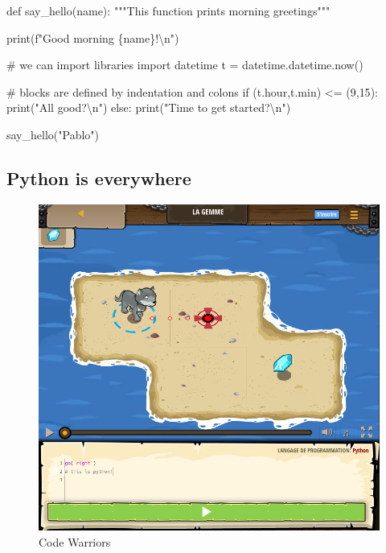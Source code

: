 \documentclass[
  letterpaper,
  DIV=11,
  numbers=noendperiod]{scrartcl}
\newenvironment{Shaded}{\begin{snugshade}}{\end{snugshade}}
\newcommand{\BuiltInTok}[1]{\textcolor[rgb]{0.00,0.23,0.31}{#1}}
\newcommand{\CharTok}[1]{\textcolor[rgb]{0.13,0.47,0.30}{#1}}
\newcommand{\CommentTok}[1]{\textcolor[rgb]{0.37,0.37,0.37}{#1}}
\newcommand{\ControlFlowTok}[1]{\textcolor[rgb]{0.00,0.23,0.31}{#1}}
\newcommand{\DecValTok}[1]{\textcolor[rgb]{0.68,0.00,0.00}{#1}}
\newcommand{\ImportTok}[1]{\textcolor[rgb]{0.00,0.46,0.62}{#1}}
\newcommand{\KeywordTok}[1]{\textcolor[rgb]{0.00,0.23,0.31}{#1}}
\newcommand{\NormalTok}[1]{\textcolor[rgb]{0.00,0.23,0.31}{#1}}
\newcommand{\OperatorTok}[1]{\textcolor[rgb]{0.37,0.37,0.37}{#1}}
\newcommand{\SpecialCharTok}[1]{\textcolor[rgb]{0.37,0.37,0.37}{#1}}
\newcommand{\SpecialStringTok}[1]{\textcolor[rgb]{0.13,0.47,0.30}{#1}}
\newcommand{\StringTok}[1]{\textcolor[rgb]{0.13,0.47,0.30}{#1}}
\begin{document}
\begin{Shaded}
\begin{Highlighting}[]
\KeywordTok{def}\NormalTok{ say\_hello(name):}
    \CommentTok{"""This function prints morning greetings"""}

    \BuiltInTok{print}\NormalTok{(}\SpecialStringTok{f"Good morning }\SpecialCharTok{\{}\NormalTok{name}\SpecialCharTok{\}}\SpecialStringTok{!}\CharTok{\textbackslash{}n}\SpecialStringTok{"}\NormalTok{)}

    \CommentTok{\# we can import libraries}
    \ImportTok{import}\NormalTok{ datetime}
\NormalTok{    t }\OperatorTok{=}\NormalTok{ datetime.datetime.now()}

    \CommentTok{\# blocks are defined by indentation and colons}
    \ControlFlowTok{if}\NormalTok{ (t.hour,t.}\BuiltInTok{min}\NormalTok{) }\OperatorTok{\textless{}=}\NormalTok{ (}\DecValTok{9}\NormalTok{,}\DecValTok{15}\NormalTok{):}
        \BuiltInTok{print}\NormalTok{(}\StringTok{"All good?}\CharTok{\textbackslash{}n}\StringTok{"}\NormalTok{)}
    \ControlFlowTok{else}\NormalTok{:}
        \BuiltInTok{print}\NormalTok{(}\StringTok{"Time to get started?}\CharTok{\textbackslash{}n}\StringTok{"}\NormalTok{)}


\NormalTok{say\_hello(}\StringTok{"Pablo"}\NormalTok{)}
\end{Highlighting}
\end{Shaded}

\subsection{Python is everywhere}\label{python-is-everywhere}

\begin{figure}[H]

{\centering \includegraphics{graphs/code_warrior.png}

}

\caption{Code Warriors}

\end{figure}%
\end{document}
